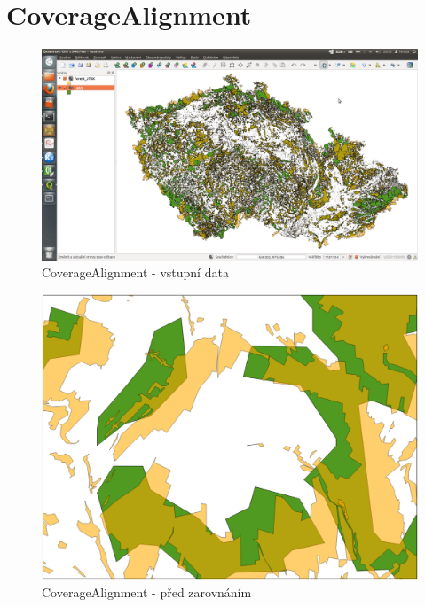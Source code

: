 \section{CoverageAlignment}
\label{ukazky-ca}

  \begin{figure}[H]
    \centering
      \includegraphics[width=400pt]{./pictures/test-ca1.png}
      \caption{CoverageAlignment - vstupní data}
      \label{fig:ca1}
  \end{figure}

  \begin{figure}[H]
    \centering
      \includegraphics[width=360pt]{./pictures/test-ca2.pdf}
      \caption{CoverageAlignment - před zarovnáním}
      \label{fig:ca2}
  \end{figure}

